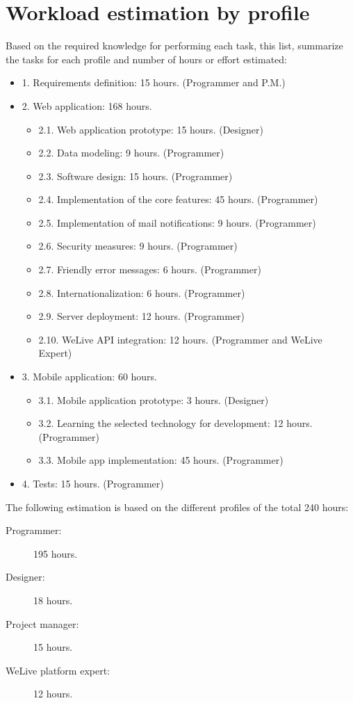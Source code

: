 \documentclass{DeustoFDP}
\begin{document}
\section{Workload estimation by profile}
Based on the required knowledge for performing each task, this list, summarize the tasks for each profile and number of hours or effort estimated:
\begin{itemize}
	\item 1. Requirements definition: 15 hours. (Programmer and P.M.)
	\item 2. Web application: 168 hours.
	\begin{itemize}
		\item 2.1. Web application prototype: 15 hours. (Designer)
		\item 2.2. Data modeling: 9 hours. (Programmer)
		\item 2.3. Software design: 15 hours. (Programmer)
		\item 2.4. Implementation of the core features: 45 hours. (Programmer)
		\item 2.5. Implementation of mail notifications: 9 hours. (Programmer)
		\item 2.6. Security measures: 9 hours. (Programmer)
		\item 2.7. Friendly error messages: 6 hours. (Programmer)
		\item 2.8. Internationalization: 6 hours. (Programmer)
		\item 2.9. Server deployment: 12 hours. (Programmer)
		\item 2.10. WeLive API integration: 12 hours. (Programmer and WeLive Expert)
	\end{itemize}
	\item 3. Mobile application: 60 hours.
	\begin{itemize}
		\item 3.1. Mobile application prototype: 3 hours. (Designer)
		\item 3.2. Learning the selected technology for development: 12 hours. (Programmer)
		\item 3.3. Mobile app implementation: 45 hours. (Programmer)
	\end{itemize}
	\item 4. Tests: 15 hours. (Programmer)
\end{itemize}

The following estimation is based on the different profiles of the total 240 hours:
\begin{description}
	\item[Programmer:] 195 hours.
	\item[Designer:] 18 hours.
	\item[Project manager:] 15 hours.
	\item[WeLive platform expert:] 12 hours.
\end{description}
\end{document}
